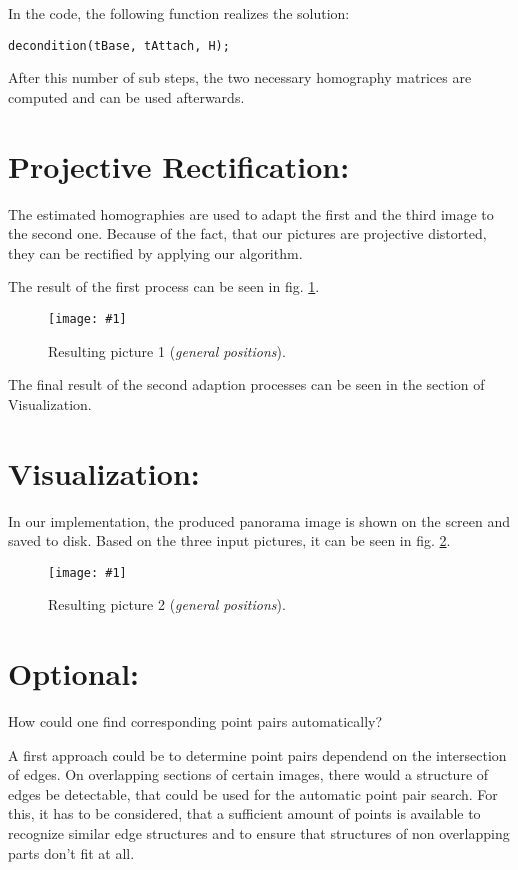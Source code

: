 \documentclass[a4paper,headings=small]{scrartcl}
\numberwithin{equation}{section} %
\numberwithin{figure}{section}   %
\newcommand{\image}[3]{
	\begin{figure}[htbp]
		\centering
		\texttt{[image: \#1]}
		\caption{#3}
		\label{fig:#1}
	\end{figure}
}
\begin{document}
In the code, the following function realizes the solution:
\begin{lstlisting}
decondition(tBase, tAttach, H);
\end{lstlisting}

After this number of sub steps, the two necessary homography matrices are computed and can be used
afterwards.

\section{Projective Rectification:}

The estimated homographies are used to adapt the first and the third image to the second one.
Because of the fact, that our pictures are projective distorted, they can be rectified by
applying our algorithm.

The result of the first process can be seen in fig. \ref{fig:../../../target/general_result_1}.

\image{../../../target/general_result_1}{0.9}{%
		Resulting picture 1 (\emph{general positions}).}


The final result of the second adaption processes can be seen in the section of Visualization.

\section{Visualization:}

In our implementation, the produced panorama image is shown on the screen and saved to disk.
Based on the three input pictures, it can be seen in fig. \ref{fig:../../../target/general_result_2}.

\image{../../../target/general_result_2}{0.9}{%
		Resulting picture 2 (\emph{general positions}).}

\section{Optional:}

How could one find corresponding point pairs automatically?

A first approach could be to determine point pairs dependend on the intersection of edges.
On overlapping sections of certain images, there would a structure of edges be detectable,
that could be used for the automatic point pair search. 
For this, it has to be considered, that a sufficient amount of points is available to
recognize similar edge structures and to ensure that structures of non overlapping parts
don't fit at all.
\end{document}
